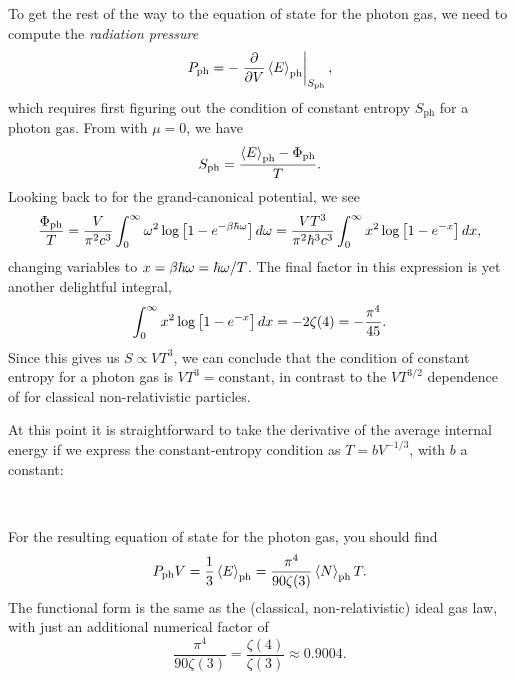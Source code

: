 To get the rest of the way to the equation of state for the photon gas, we need to compute the \textit{radiation pressure}
\begin{equation*}
  P_{\text{ph}} = -\left. \frac{\partial }{\partial V} \left\langle E \right\rangle_{\text{ph}} \right|_{S_{\text{ph}}},
\end{equation*}
which requires first figuring out the condition of constant entropy $S_{\text{ph}}$ for a photon gas.
From  with $\mu = 0$, we have
\begin{equation*}
  S_{\text{ph}} = \frac{\left\langle E \right\rangle_{\text{ph}} - \Phi_{\text{ph}}}{T}.
\end{equation*}
Looking back to  for the grand-canonical potential, we see
\begin{equation*}
  \frac{\Phi_{\text{ph}}}{T} = \frac{V}{\pi^2 c^3} \int_0^{\infty} \omega^2 \log\left[1 - e^{-\beta \hbar \omega}\right] \mathop{d\omega} = \frac{VT^3}{\pi^2 \hbar^3 c^3} \int_0^{\infty} x^2 \log\left[1 - e^{-x}\right] \mathop{dx},
\end{equation*}
changing variables to $x = \beta \hbar \omega = \hbar \omega / T$.
The final factor in this expression is yet another delightful integral,
\begin{equation*}
  \int_0^{\infty} x^2 \log\left[1 - e^{-x}\right] \mathop{dx} = -2\zeta(4) = -\frac{\pi^4}{45}.
\end{equation*}
Since this gives us $S \propto VT^3$, we can conclude that the condition of constant entropy for a photon gas is $V T^3 = \mbox{constant}$, in contrast to the $V T^{3/2}$ dependence of  for classical non-relativistic particles.

At this point it is straightforward to take the derivative of the average internal energy if we express the constant-entropy condition as $T = b V^{-1 / 3}$, with $b$ a constant:
\begin{mdframed}
  \ \\[120 pt]
\end{mdframed}
For the resulting equation of state for the photon gas, you should find
\begin{equation}
  \label{eq:photon_eos}
  P_{\text{ph}} V = \frac{1}{3} \left\langle E \right\rangle_{\text{ph}} = \frac{\pi^4}{90\zeta(3)} \left\langle N \right\rangle_{\text{ph}} T.
\end{equation}
The functional form is the same as the (classical, non-relativistic) ideal gas law, with just an additional numerical factor of
\begin{equation*}
  \frac{\pi^4}{90\zeta(3)} = \frac{\zeta(4)}{\zeta(3)} \approx 0.9004.
\end{equation*}



